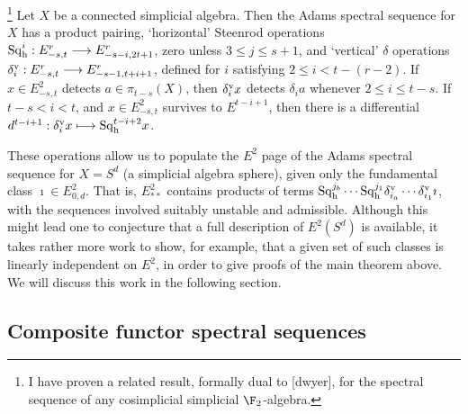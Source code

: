 \documentclass[11pt]{article}
\newcommand{\Sq}{\mathrm{Sq}}
\begin{document}
\begin{thm*}\textbf{}\!\!\!\textbf{}%
\footnote{I have proven a related result, formally dual to [dwyer], for the spectral sequence of any cosimplicial simplicial $\F_2$-algebra.}\label{adamsOperationsOmnibus}
Let $X$ be a connected simplicial algebra. Then the Adams spectral sequence for $X$ has a product pairing, `horizontal' Steenrod operations $\Sq^i_\textup{h}:E^r_{-s,t}\to E^r_{-s-i,2t+1}$, zero unless $3\leq j\leq s+1$, and `vertical' $\delta$ operations $\delta_i^\textup{v}:E^r_{-s,t}\to E^r_{-s-1,t+i+1}$, defined for $i$ satisfying $2\leq i<t-(r-2)$. If $x\in E^2_{-s,t}$ detects $a\in\pi_{t-s}(X)$, then $\delta_i^\textup{v}x$ detects $\delta_ia$ whenever $2\leq i\leq t-s$. If $t-s<i<t$, and $x\in E^2_{-s,t}$ survives to $E^{t-i+1}$, then there is a differential $d^{t-i+1}:\delta_i^\textup{v}x\mapsto \Sq_\textup{h}^{t-i+2}x$.
\end{thm*}


These operations allow us to populate the $E^2$ page of the Adams spectral sequence for $X=S^d$ (a simplicial algebra sphere), given only the fundamental class $\imath\in E^2_{0,d}$. That is, $E^2_{**}$ contains products of terms $\Sq^{j_b}_\textup{h}\cdots \Sq^{j_1}_\textup{h}\delta_{i_a}^\textup{v}\cdots \delta_{i_1}^\textup{v}\imath$, with the sequences involved suitably unstable and admissible. Although this might lead one to conjecture that a full description of $E^2(S^d)$ is available, it takes rather more work to show, for example, that a given set of such classes is linearly independent on $E^2$, in order to give proofs of the main theorem above. We will discuss this work in the following section.
\subsection*{Composite functor spectral sequences}
\end{document}
